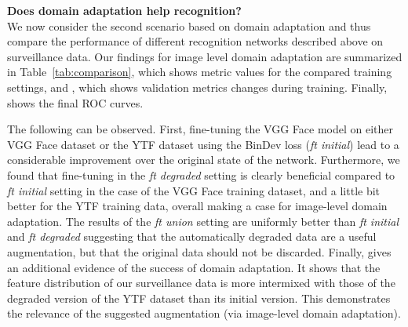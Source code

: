  
 
\bigskip\indent\textbf{Does domain adaptation help recognition?} \\
\label{sect:results}
We now consider the second scenario based on domain adaptation and thus compare the performance of different recognition networks described above on surveillance data. Our findings for image level domain adaptation are summarized in Table~\ref{tab:comparison}, which shows metric values for the compared training settings, and , which shows validation metrics changes during training. Finally,  shows the final ROC curves.

The following can be observed. First, fine-tuning the VGG Face model on either VGG Face dataset or the YTF dataset using the BinDev loss (\textit{ft initial}) lead to a considerable improvement over the original state of the network.
Furthermore, we found that fine-tuning in the \textit{ft degraded} setting is clearly beneficial compared to \textit{ft initial} setting in the case of the VGG Face training dataset, and a little bit better for the YTF training data, overall making a case for image-level domain adaptation. The results of the \textit{ft union} setting are uniformly better than \textit{ft initial} and \textit{ft degraded} suggesting that the automatically degraded data are a useful augmentation, but that the original data should not be discarded. 
Finally,  gives an additional evidence of the success of domain adaptation. It shows that the feature distribution of our surveillance data is more intermixed with those of the degraded version of the YTF dataset than its initial version. This demonstrates the relevance of the suggested augmentation (via image-level domain adaptation).





